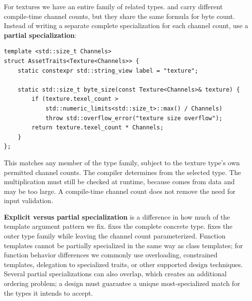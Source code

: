 For textures we have an entire family of related types.  and  carry different compile-time channel counts, but they share the same formula for byte count. Instead of writing a separate complete specialization for each channel count, use a \textbf{partial specialization}:

\begin{verbatim}
template <std::size_t Channels>
struct AssetTraits<Texture<Channels>> {
    static constexpr std::string_view label = "texture";

    static std::size_t byte_size(const Texture<Channels>& texture) {
        if (texture.texel_count >
            std::numeric_limits<std::size_t>::max() / Channels)
            throw std::overflow_error("texture size overflow");
        return texture.texel_count * Channels;
    }
};
\end{verbatim}

This matches any member of the  type family, subject to the texture type's own permitted channel counts. The compiler determines  from the selected  type. The multiplication must still be checked at runtime, because  comes from data and may be too large. A compile-time channel count does not remove the need for input validation.

\textbf{Explicit versus partial specialization} is a difference in how much of the template argument pattern we fix.  fixes the complete concrete type.  fixes the outer type family while leaving the channel count parameterized. Function templates cannot be partially specialized in the same way as class templates; for function behavior differences we commonly use overloading, constrained templates, delegation to specialized traits, or other supported design techniques. Several partial specializations can also overlap, which creates an additional ordering problem; a design must guarantee a unique most-specialized match for the types it intends to accept.

